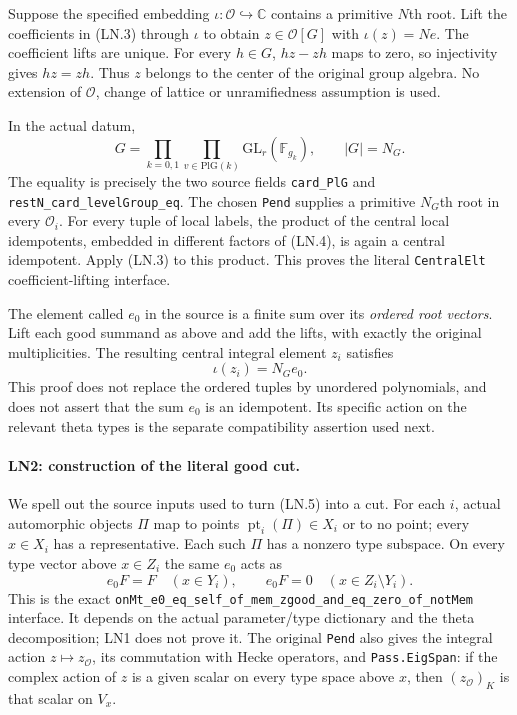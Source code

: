Suppose the specified embedding $\iota:\mathcal O\hookrightarrow
\mathbb C$ contains a primitive $N$th root.  Lift the coefficients in
(LN.3) through $\iota$ to obtain $z\in\mathcal O[G]$ with
$\iota(z)=Ne$.  The coefficient lifts are unique.  For every $h\in G$,
$hz-zh$ maps to zero, so injectivity gives $hz=zh$.  Thus $z$ belongs
to the center of the original group algebra.  No extension of
$\mathcal O$, change of lattice or unramifiedness assumption is used.

In the actual datum,
\[
 G=\prod_{k=0,1}\prod_{v\in\mathrm{PlG}(k)}
       \mathrm{GL}_r(\mathbb F_{g_k}),\qquad |G|=N_G.
 \tag{LN.4}
\]
The equality is precisely the two source fields
\texttt{card\_PlG} and \texttt{restN\_card\_levelGroup\_eq}.
The chosen \texttt{Pend} supplies a primitive $N_G$th root in every
$\mathcal O_i$.  For every tuple of local labels, the product of the
central local idempotents, embedded in different factors of (LN.4),
is again a central idempotent.  Apply (LN.3) to this product.  This
proves the literal \texttt{CentralElt} coefficient-lifting interface.

The element called $e_0$ in the source is a finite sum over its
\emph{ordered root vectors}.  Lift each good summand as above and add
the lifts, with exactly the original multiplicities.  The resulting
central integral element $z_i$ satisfies
\[
                  \iota(z_i)=N_Ge_0.                 \tag{LN.5}
\]
This proof does not replace the ordered tuples by unordered
polynomials, and does not assert that the sum $e_0$ is an idempotent.
Its specific action on the relevant theta types is the separate
compatibility assertion used next.

\paragraph{LN2: construction of the literal good cut.}
\label{claim:LN2}
We spell out the source inputs used to turn (LN.5) into a cut.  For
each $i$, actual automorphic objects $\Pi$ map to points
$\operatorname{pt}_i(\Pi)\in X_i$ or to no point; every $x\in X_i$
has a representative.  Each such $\Pi$ has a nonzero type subspace.
On every type vector above $x\in Z_i$ the same $e_0$ acts as
\[
 e_0F=F\quad(x\in Y_i),\qquad
 e_0F=0\quad(x\in Z_i\setminus Y_i).                 \tag{LN.6}
\]
This is the exact \texttt{onMt\_e0\_eq\_self\_of\_mem\_zgood\_and\_eq\_zero\_of\_notMem}
interface.  It depends on the actual parameter/type dictionary and
the theta decomposition; LN1 does not prove it.  The original
\texttt{Pend} also gives the integral action $z\mapsto z_{\mathcal O}$,
its commutation with Hecke operators, and \texttt{Pass.EigSpan}: if the
complex action of $z$ is a given scalar on every type space above $x$,
then $(z_{\mathcal O})_K$ is that scalar on $V_x$.

